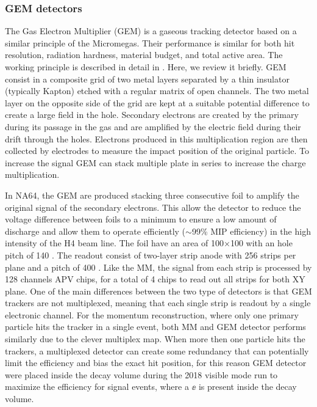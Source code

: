   \subsubsection{GEM detectors}
  \label{ch2:sec:gem}
  The Gas Electron Multiplier (GEM) is a gaseous tracking detector based on a similar principle of the Micromegas. Their performance is similar for both hit resolution, radiation hardness, material budget, and total active area. The working principle is described in detail in \cite{gem,SAULI20162,ABBON2007455}. Here, we review it briefly. GEM consist in a composite grid of two metal layers separated by a thin insulator (typically Kapton) etched with a regular matrix of open channels. The two metal layer on the opposite side of the grid are kept at a suitable potential difference to create a large field in the hole. Secondary electrons are created by the primary during its passage in the gas and are amplified by the electric field during their drift through the holes. Electrons produced in this multiplication region are then collected by electrodes to measure the impact position of the original particle. To increase the signal GEM can stack multiple plate in series to increase the charge multiplication.

  In NA64, the GEM are produced stacking three consecutive foil to amplify the original signal of the secondary electrons. This allow the detector to reduce the voltage difference between foils to a minimum to ensure a low amount of discharge and allow them to operate efficiently ($\sim$99\% MIP efficiency) in the high intensity of the H4 beam line. The foil have an area of 100$\times$100 \mms with an hole pitch of 140 \mum. The readout consist of two-layer strip anode with 256 strips per plane and a pitch of 400 \mum. Like the MM, the signal from each strip is processed by 128 channels APV chips, for a total of 4 chips to read out all strips for both XY plane.
  One of the main differences between the two type of detectors is that GEM trackers are not multiplexed, meaning that each single strip is readout by a single electronic channel. For the momentum reconstruction, where only one primary particle hits the tracker in a single event, both MM and GEM detector performs similarly due to the clever multiplex map. When more then one particle hits the trackers, a multiplexed detector can create some redundancy that can potentially limit the efficiency and bias the exact hit position, for this reason GEM detector were placed inside the decay volume during the 2018 visible mode run to maximize the efficiency for signal events, where a $\ee$ is present inside the decay volume.

